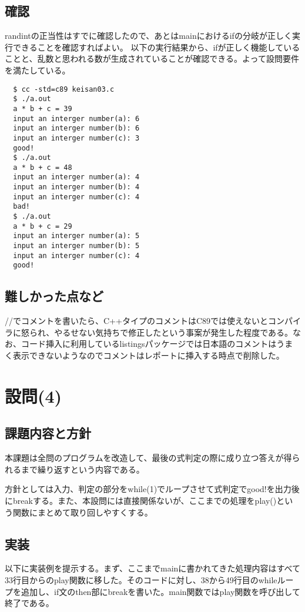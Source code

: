 \documentclass[dvipdfmx,12pt,a4j]{jarticle}
\begin{document}
\subsection{確認}
randintの正当性はすでに確認したので、あとはmainにおけるifの分岐が正しく実行できることを確認すればよい。
以下の実行結果から、ifが正しく機能していることと、乱数と思われる数が生成されていることが確認できる。よって設問要件を満たしている。
\begin{verbatim}
  $ cc -std=c89 keisan03.c
  $ ./a.out
  a * b + c = 39
  input an interger number(a): 6
  input an interger number(b): 6
  input an interger number(c): 3
  good!
  $ ./a.out
  a * b + c = 48
  input an interger number(a): 4
  input an interger number(b): 4
  input an interger number(c): 4
  bad!
  $ ./a.out
  a * b + c = 29
  input an interger number(a): 5
  input an interger number(b): 5
  input an interger number(c): 4
  good!
\end{verbatim}

\subsection{難しかった点など}
//でコメントを書いたら、C++タイプのコメントはC89では使えないとコンパイラに怒られ、やるせない気持ちで修正したという事案が発生した程度である。なお、コード挿入に利用しているlistingsパッケージでは日本語のコメントはうまく表示できないようなのでコメントはレポートに挿入する時点で削除した。

\section{設問(4)}
\subsection{課題内容と方針}
本課題は全問のプログラムを改造して、最後の式判定の際に成り立つ答えが得られるまで繰り返すという内容である。

方針としては入力、判定の部分をwhile(1)でループさせて式判定でgood!を出力後にbreakする。また、本設問には直接関係ないが、ここまでの処理をplay()という関数にまとめて取り回しやすくする。

\subsection{実装}
以下に実装例を提示する。まず、ここまでmainに書かれてきた処理内容はすべて33行目からのplay関数に移した。そのコードに対し、38から49行目のwhileループを追加し、if文のthen部にbreakを書いた。main関数ではplay関数を呼び出して終了である。

\end{document}
